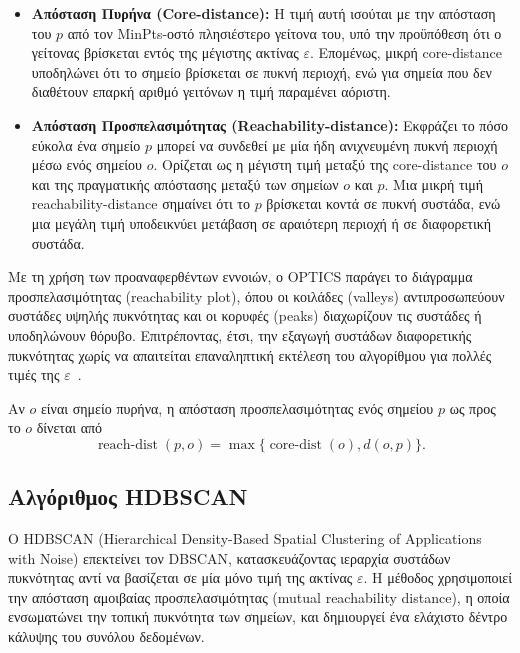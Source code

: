\begin{itemize}
    \item \textbf{Απόσταση Πυρήνα (Core-distance):} Η τιμή αυτή ισούται με την απόσταση του $p$ από τον MinPts-οστό πλησιέστερο γείτονα του, υπό την προϋπόθεση ότι ο γείτονας βρίσκεται εντός της μέγιστης ακτίνας $\varepsilon$. Επομένως, μικρή core-distance υποδηλώνει ότι το σημείο βρίσκεται σε πυκνή περιοχή, ενώ για σημεία που δεν διαθέτουν επαρκή αριθμό γειτόνων η τιμή παραμένει αόριστη.

    \item \textbf{Απόσταση Προσπελασιμότητας (Reachability-distance):} Εκφράζει το πόσο εύκολα ένα σημείο $p$ μπορεί να συνδεθεί με μία ήδη ανιχνευμένη πυκνή περιοχή μέσω ενός σημείου $o$. Ορίζεται ως η μέγιστη τιμή μεταξύ της core-distance του $o$ και της πραγματικής απόστασης μεταξύ των σημείων $o$ και $p$. Μια μικρή τιμή reachability-distance σημαίνει ότι το $p$ βρίσκεται κοντά σε πυκνή συστάδα, ενώ μια μεγάλη τιμή υποδεικνύει μετάβαση σε αραιότερη περιοχή ή σε διαφορετική συστάδα.
\end{itemize}

Με τη χρήση των προαναφερθέντων εννοιών, ο OPTICS παράγει το διάγραμμα προσπελασιμότητας (reachability plot), όπου οι κοιλάδες (valleys) αντιπροσωπεύουν συστάδες υψηλής πυκνότητας και οι κορυφές (peaks) διαχωρίζουν τις συστάδες ή υποδηλώνουν θόρυβο. Επιτρέποντας, έτσι, την εξαγωγή συστάδων διαφορετικής πυκνότητας χωρίς να απαιτείται επαναληπτική εκτέλεση του αλγορίθμου για πολλές τιμές της $\varepsilon$~\cite{optics1999}.

Αν $o$ είναι σημείο πυρήνα, η απόσταση προσπελασιμότητας ενός σημείου $p$ ως προς το $o$ δίνεται από
\begin{equation}
\operatorname{reach\text{-}dist}(p,o)=\max\{\operatorname{core\text{-}dist}(o),d(o,p)\}.
\label{eq:optics-reachability}
\end{equation}

\subsection{Αλγόριθμος HDBSCAN}

Ο HDBSCAN (Hierarchical Density-Based Spatial Clustering of Applications with Noise) επεκτείνει τον DBSCAN, κατασκευάζοντας ιεραρχία συστάδων πυκνότητας αντί να βασίζεται σε μία μόνο τιμή της ακτίνας $\varepsilon$. Η μέθοδος χρησιμοποιεί την απόσταση αμοιβαίας προσπελασιμότητας (mutual reachability distance), η οποία ενσωματώνει την τοπική πυκνότητα των σημείων, και δημιουργεί ένα ελάχιστο δέντρο κάλυψης του συνόλου δεδομένων.

